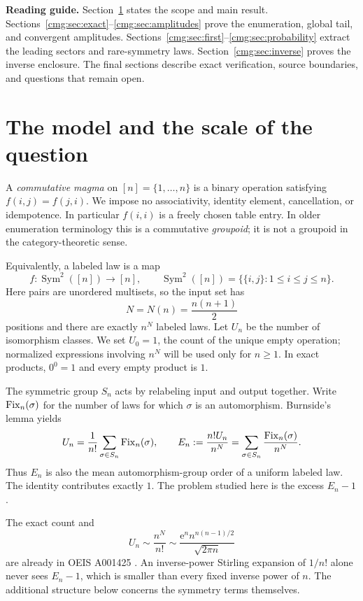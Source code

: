 \documentclass[11pt,letterpaper]{article}
\numberwithin{equation}{section}
\theoremstyle{definition}\newtheorem{definition}[theorem]{Definition}
\theoremstyle{remark}\newtheorem{remark}[theorem]{Remark}
\newcommand{\Sym}{\operatorname{Sym}}\newcommand{\ee}{\mathrm e}
\begin{document}
\clearpage
{\small\setcounter{tocdepth}{1}\tableofcontents}
\bigskip
\noindent\textbf{Reading guide.} Section~\ref{cmg:sec:main} states the scope and main result. Sections~\ref{cmg:sec:exact}--\ref{cmg:sec:amplitudes} prove the enumeration, global tail, and convergent amplitudes. Sections~\ref{cmg:sec:first}--\ref{cmg:sec:probability} extract the leading sectors and rare-symmetry laws. Section~\ref{cmg:sec:inverse} proves the inverse enclosure. The final sections describe exact verification, source boundaries, and questions that remain open.
\newpage

\section{The model and the scale of the question}\label{cmg:sec:main}
A \emph{commutative magma} on $[n]=\{1,\ldots,n\}$ is a binary operation satisfying $f(i,j)=f(j,i)$. We impose no associativity, identity element, cancellation, or idempotence. In particular $f(i,i)$ is a freely chosen table entry. In older enumeration terminology this is a commutative \emph{groupoid}; it is not a groupoid in the category-theoretic sense.

Equivalently, a labeled law is a map
\[
 f:\Sym^2([n])\longrightarrow[n],\qquad
 \Sym^2([n])=\{\{i,j\}:1\le i\le j\le n\}.
\]
Here pairs are unordered multisets, so the input set has
\begin{equation}\label{cmg:eq:N}
 N=N(n)=\frac{n(n+1)}2
\end{equation}
positions and there are exactly $n^N$ labeled laws. Let $U_n$ be the number of isomorphism classes. We set $U_0=1$, the count of the unique empty operation; normalized expressions involving $n^N$ will be used only for $n\ge1$. In exact products, $0^0=1$ and every empty product is $1$.

The symmetric group $S_n$ acts by relabeling input and output together. Write $\operatorname{Fix}_n(\sigma)$ for the number of laws for which $\sigma$ is an automorphism. Burnside's lemma yields
\begin{equation}\label{cmg:eq:burnside}
 U_n=\frac1{n!}\sum_{\sigma\in S_n}\operatorname{Fix}_n(\sigma),\qquad
 E_n:=\frac{n!U_n}{n^N}=\sum_{\sigma\in S_n}\frac{\operatorname{Fix}_n(\sigma)}{n^N}.
\end{equation}
Thus $E_n$ is also the mean automorphism-group order of a uniform labeled law. The identity contributes exactly $1$. The problem studied here is the excess $E_n-1$.

The exact count and
\begin{equation}\label{cmg:eq:known-leading}
 U_n\sim\frac{n^N}{n!}\sim\frac{\ee^n n^{n(n-1)/2}}{\sqrt{2\pi n}}
\end{equation}
are already in OEIS A001425 \cite{oeis}. An inverse-power Stirling expansion of $1/n!$ alone never sees $E_n-1$, which is smaller than every fixed inverse power of $n$. The additional structure below concerns the symmetry terms themselves.
\end{document}
